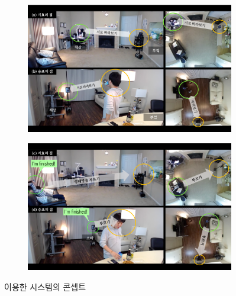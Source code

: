
\begin{figure}
\begin{subfigure}{.5\textwidth}
  \centering
  \includegraphics[width=\textwidth]{images/concept1}
\end{subfigure}
\begin{subfigure}{.5\textwidth}
  \centering
  \includegraphics[width=\textwidth]{images/concept2}
\end{subfigure}
\caption{ 이용한 시스템의 콘셉트}
\label{fig:concept}
\end{figure}


